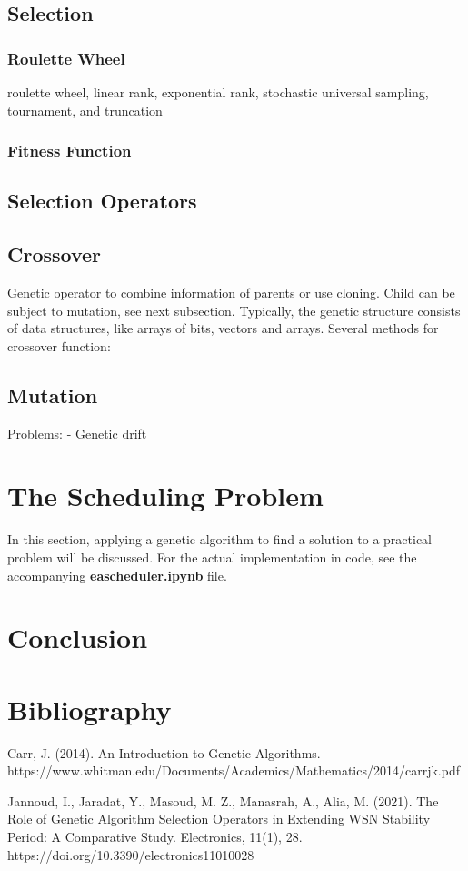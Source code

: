 \documentclass{article}
\begin{document}
\bigskip
\subsection{Selection}

\subsubsection{Roulette Wheel}

roulette wheel, linear rank, exponential rank, stochastic universal sampling, tournament, and truncation

\bigskip
\subsubsection{Fitness Function}

\subsection{Selection Operators}
\bigskip
\subsection{Crossover}
Genetic operator to combine information of parents or use cloning. Child can be subject to mutation, see next subsection. Typically, the genetic structure consists of data structures, like arrays of bits, vectors and arrays.\smallbreak
Several methods for crossover function:

\bigskip
\subsection{Mutation}
Problems:
- Genetic drift

\newpage
\section{The Scheduling Problem}
In this section, applying a genetic algorithm to find a solution to a practical problem will be discussed. For the actual implementation in code, see the accompanying \textbf{ea\textunderscore scheduler.ipynb} file.

\newpage
\section{Conclusion}

\newpage
\section{Bibliography}
Carr, J. (2014). An Introduction to Genetic Algorithms.\smallbreak
https://www.whitman.edu/Documents/Academics/Mathematics/2014/carrjk.pdf

Jannoud, I., Jaradat, Y., Masoud, M. Z., Manasrah, A., Alia, M. (2021). The Role of Genetic Algorithm Selection Operators in Extending WSN Stability Period: A Comparative Study. Electronics, 11(1), 28. https://doi.org/10.3390/electronics11010028‌
\end{document}
